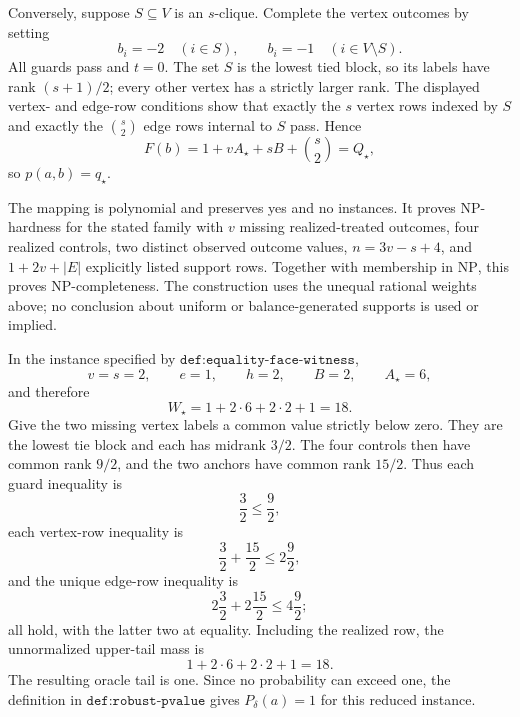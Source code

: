Conversely, suppose \(S\subseteq V\) is an \(s\)-clique.  Complete the vertex outcomes by setting
\[
 b_i=-2\quad(i\in S),
 \qquad
 b_i=-1\quad(i\in V\setminus S).
\]
All guards pass and \(t=0\).  The set \(S\) is the lowest tied block, so its labels have rank \((s+1)/2\); every other vertex has a strictly larger rank.  The displayed vertex- and edge-row conditions show that exactly the \(s\) vertex rows indexed by \(S\) and exactly the \(\binom{s}{2}\) edge rows internal to \(S\) pass.  Hence
\[
 F(b)=1+vA_\star+sB+\binom{s}{2}=Q_\star,
\]
so \(p(a,b)=q_\star\).

The mapping is polynomial and preserves yes and no instances.  It proves NP-hardness for the stated family with \(v\) missing realized-treated outcomes, four realized controls, two distinct observed outcome values, \(n=3v-s+4\), and \(1+2v+|E|\) explicitly listed support rows.  Together with membership in \(\mathrm{NP}\), this proves NP-completeness.  The construction uses the unequal rational weights above; no conclusion about uniform or balance-generated supports is used or implied.

In the instance specified by \(\texttt{def:equality-face-witness}\),
\[
 v=s=2,\qquad e=1,\qquad h=2,
 \qquad B=2,
 \qquad A_\star=6,
\]
and therefore
\[
 W_\star=1+2\cdot6+2\cdot2+1=18.
\]
Give the two missing vertex labels a common value strictly below zero.  They are the lowest tie block and each has midrank \(3/2\).  The four controls then have common rank \(9/2\), and the two anchors have common rank \(15/2\).  Thus each guard inequality is
\[
 \frac32\le\frac92,
\]
each vertex-row inequality is
\[
 \frac32+\frac{15}{2}\le2\frac92,
\]
and the unique edge-row inequality is
\[
 2\frac32+2\frac{15}{2}\le4\frac92;
\]
all hold, with the latter two at equality.  Including the realized row, the unnormalized upper-tail mass is
\[
 1+2\cdot6+2\cdot2+1=18.
\]
The resulting oracle tail is one.  Since no probability can exceed one, the definition in \(\texttt{def:robust-pvalue}\) gives \(P_\delta(a)=1\) for this reduced instance.

